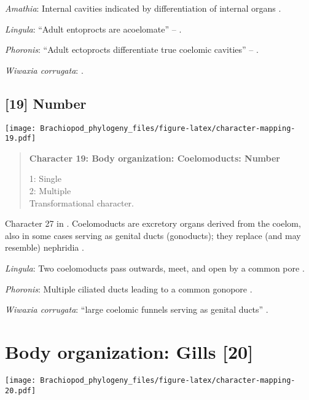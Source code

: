 \documentclass[openany]{book}
\theoremstyle{definition}
\theoremstyle{definition}
\theoremstyle{definition}
\theoremstyle{remark}
\begin{document}
\hypertarget{Amathia-coding-18}{}
\emph{Amathia}: Internal cavities indicated by differentiation of
internal organs \citep[see][]{Moysiuk2017Hyolithsare}.

\hypertarget{Lingula-coding-18}{}
\emph{Lingula}: ``Adult entoprocts are acoelomate'' --
\citet{Fuchs2008}.

\hypertarget{Phoronis-coding-18}{}
\emph{Phoronis}: ``Adult ectoprocts differentiate true coelomic
cavities'' -- \citet{Fuchs2008}.

\hypertarget{Wiwaxia_corrugata-coding-18}{}
\emph{Wiwaxia corrugata}: \citet{Temereva2017Innervationof}.

\subsection*{{[}19{]} Number}\label{number-1}

\texttt{[image: Brachiopod\_phylogeny\_files/figure-latex/character-mapping-19.pdf]}

\begin{quote}
\textbf{Character 19: Body organization: Coelomoducts: Number}

1: Single\\
2: Multiple\\
Transformational character.
\end{quote}

Character 27 in \citet{Haszprunar2000}. Coelomoducts are excretory
organs derived from the coelom, also in some cases serving as genital
ducts (gonoducts); they replace (and may resemble) nephridia
\citep{Goodrich1945}.

\hypertarget{Lingula-coding-19}{}
\emph{Lingula}: Two coelomoducts pass outwards, meet, and open by a
common pore \citep{Goodrich1945}.

\hypertarget{Phoronis-coding-19}{}
\emph{Phoronis}: Multiple ciliated ducts leading to a common gonopore
\citep{Goodrich1945}.

\hypertarget{Wiwaxia_corrugata-coding-19}{}
\emph{Wiwaxia corrugata}: ``large coelomic funnels serving as genital
ducts'' \citep{Goodrich1945}.

\section{Body organization: Gills
{[}20{]}}\label{body-organization-gills-20}

\texttt{[image: Brachiopod\_phylogeny\_files/figure-latex/character-mapping-20.pdf]}
\end{document}
